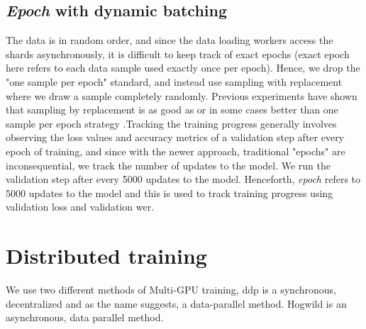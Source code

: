 \subsection{\emph{Epoch} with dynamic batching}
The data is in random order, and since the data loading workers access the shards asynchronously, it is difficult to keep track of exact epochs (exact epoch here refers to each data sample used exactly once per epoch). Hence, we drop the "one sample per epoch" standard, and instead use sampling with replacement where we draw a sample completely randomly. Previous experiments have shown that sampling by replacement is as good as or in some cases better than one sample per epoch strategy \cite{Recht2012BeneathConsequences, Nielsen2015NeuralLearning}.Tracking the training progress generally involves observing the loss values and accuracy metrics of a validation step after every epoch of training, and since with the newer approach, traditional "epochs" are inconsequential, we track the number of updates to the model. We run the validation step after every 5000 updates to the model. Henceforth, \emph{epoch} refers to 5000 updates to the model and this is used to track training progress using validation loss and validation \acrshort{wer}.

\section{Distributed training}
\label{section:di}
We use two different methods of Multi-GPU training, \acrfull{ddp} is a synchronous, decentralized and as the name suggests, a data-parallel method. Hogwild is an asynchronous, data parallel method. 

